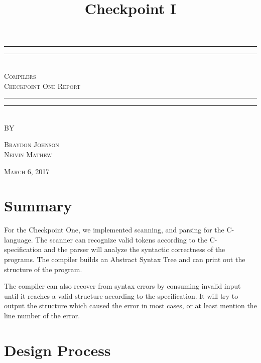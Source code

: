 \documentclass[12pt,letterpaper]{article}
\title{Checkpoint I}
\begin{document}
\begin{titlepage}
    \centering
    \vspace*{\baselineskip}
    \rule{\textwidth}{1.6pt}\vspace*{-\baselineskip}\vspace*{2pt}
    \rule{\textwidth}{0.4pt}\\[1.5\baselineskip]
    {\LARGE \textsc{Compilers \\ Checkpoint One Report}}\\[\baselineskip]
	\rule{\textwidth}{0.4pt}\vspace*{-\baselineskip}\vspace{4pt}    
    \rule{\textwidth}{2pt}\\[2\baselineskip]
   
    \vspace*{7\baselineskip}
    \textsc{BY}
    
    \vspace*{0.25\baselineskip}
    {\textsc{Braydon Johnson \\ Neivin Mathew} \par}
    \vfill
    {\scshape March 6, 2017} \\
  \end{titlepage}
  
  
\tableofcontents
\lhead{} %
\clearpage
{} %
    
\section{Summary}
For the Checkpoint One, we implemented scanning, and parsing for the C- language. The scanner can recognize valid tokens according to the C- specification and the parser will analyze the syntactic correctness of the programs. The compiler builds an Abstract Syntax Tree and can print out the structure of the program.\par
The compiler can also recover from syntax errors by consuming invalid input until it reaches a valid structure according to the specification. It will try to output the structure which caused the error in most cases, or at least mention the line number of the error.

\section{Design Process}
\end{document}
